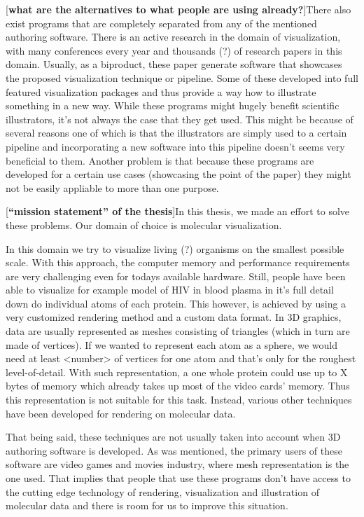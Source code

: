 \documentclass[
  digital, %
  table,   %
  nolof,     %
  nolot,     %
]{fithesis3}
\begin{document}
[\textbf{what are the alternatives to what people are using already?}]There also exist programs that are completely separated from any of the mentioned authoring software. There is an active research in the domain of visualization, with many conferences every year and thousands (?) of research papers in this domain. Usually, as a biproduct, these paper generate software that showcases the proposed visualization technique or pipeline. Some of these developed into full featured visualization packages and thus provide a way how to illustrate something in a new way. While these programs might hugely benefit scientific illustrators, it's not always the case that they get used. This might be because of several reasons one of which is that the illustrators are simply used to a certain pipeline and incorporating a new software into this pipeline doesn't seems very beneficial to them. Another problem is that because these programs are developed for a certain use cases (showcasing the point of the paper) they might not be easily appliable to more than one purpose.

[\textbf{``mission statement'' of the thesis}]In this thesis, we made an effort to solve these problems. Our domain of choice is molecular visualization.

In this domain we try to visualize living (?) organisms on the smallest possible scale. With this approach, the computer memory and performance requirements are very challenging even for todays available hardware. Still, people have been able to visualize for example model of HIV in blood plasma in it's full detail down do individual atoms of each protein. This however, is achieved by using a very customized rendering method and a custom data format. In 3D graphics, data are usually represented as meshes consisting of triangles (which in turn are made of vertices). If we wanted to represent each atom as a sphere, we would need at least <number> of vertices for one atom and that's only for the roughest level-of-detail. With such representation, a one whole protein could use up to X bytes of memory which already takes up most of the video cards' memory. Thus this representation is not suitable for this task. Instead, various other techniques have been developed for rendering on molecular data.

That being said, these techniques are not usually taken into account when 3D authoring software is developed. As was mentioned, the primary users of these software are video games and movies industry, where mesh representation is the one used. That implies that people that use these programs don't have access to the cutting edge technology of rendering, visualization and illustration of molecular data and there is room for us to improve this situation.
\end{document}
